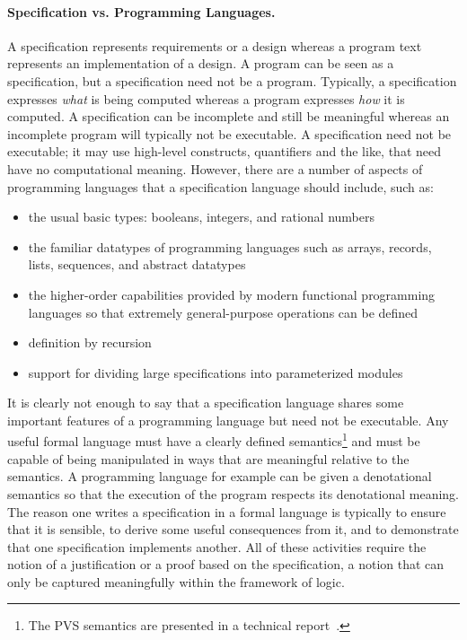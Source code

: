 \paragraph{Specification vs. Programming Languages.}
A specification represents requirements or a design whereas a program
text represents an implementation of a design.  A program can be seen as
a specification, but a specification need not be a program.  Typically,
a specification expresses \emph{what} is being
computed whereas a program expresses \emph{how} it is computed.  A
specification can be incomplete and still be meaningful whereas an
incomplete program will typically not be executable.  A specification
need not be executable; it may use high-level constructs, quantifiers
and the like, that need have no computational meaning.  However, there
are a number of aspects of programming languages that a specification
language should include, such as:
\begin{itemize}

\item the usual basic types: booleans, integers, and rational numbers

\item the familiar datatypes of programming languages such as arrays,
records, lists, sequences, and abstract datatypes

\item the higher-order capabilities provided by modern functional
programming languages so that extremely general-purpose operations can
be defined

\item definition by recursion

\item support for dividing large specifications into parameterized
modules

\end{itemize}

It is clearly not enough to say that a specification language shares some
important features of a programming language but need not be executable.
Any useful formal language must have a clearly defined
semantics\footnote{The PVS semantics are presented in a technical
report~\cite{PVS:semantics}.} and must be capable of being manipulated in
ways that are meaningful relative to the semantics.  A programming
language for example can be given a denotational semantics so that the
execution of the program respects its denotational meaning.  The reason
one writes a specification in a formal language is typically to ensure
that it is sensible, to derive some useful consequences from it, and to
demonstrate that one specification implements another.  All of these
activities require the notion of a justification or a proof based on the
specification, a notion that can only be captured meaningfully within the
framework of logic.

